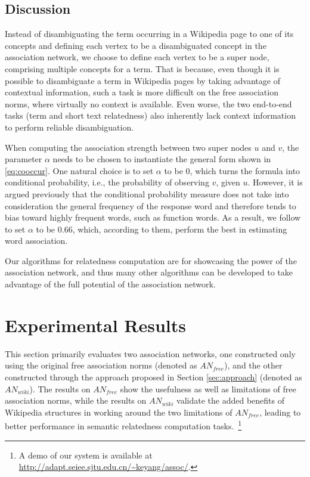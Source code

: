 \documentclass[letterpaper]{article}
\newcommand{\secref}[1]{Section \ref{#1}}
\begin{document}
\subsection{Discussion}
\label{sec:discussion}

Instead of disambiguating the term occurring in a Wikipedia page to
one of its concepts and defining each vertex to be a disambiguated
concept in the association network, we choose to define each vertex
to be a super node, comprising multiple concepts for a term.
That is because, even though it is possible to disambiguate a term
in Wikipedia pages by taking advantage of contextual information,
such a task is more difficult on the free association norms, where
virtually no context is available. Even worse, the two end-to-end
tasks (term and short text relatedness) also
inherently lack context information to perform reliable
disambiguation.

When computing the association strength between two super nodes $u$ and
$v$, the parameter $\alpha$ needs to be chosen to instantiate the
general form shown in \eqref{eq:cooccur}. One natural choice is to
set $\alpha$ to be 0, which turns the formula into conditional
probability, i.e., the probability of observing $v$, given $u$.
However, it is argued previously \cite{Wettler:1993,asso09} that 
the conditional probability measure does not take into consideration the
general frequency of the response word and therefore tends to bias
toward highly frequent words, such as function words. As a result, 
we follow \cite{Wettler:1993} to set $\alpha$ to be 0.66, 
which, according to them, perform the best in estimating word association. 

Our algorithms for relatedness computation are for showcasing the power of 
the association network, and thus many other algorithms
can be developed to  take advantage of the full potential of the association network.

\section{Experimental Results}
\label{sec:eval}

This section primarily evaluates two association networks, one
constructed only using the original free association norms (denoted
as $AN_{free}$), and the other constructed through the approach
proposed in \secref{sec:approach} (denoted as $AN_{wiki}$). The
results on $AN_{free}$ show the usefulness as well as limitations of free association
norms, while the results
on $AN_{wiki}$ validate the added benefits of Wikipedia structures 
in working around the two limitations of $AN_{free}$, leading to
better performance in semantic relatedness computation tasks.~\footnote{A demo of our system is available at
\url{http://adapt.seiee.sjtu.edu.cn/~keyang/assoc/}.}
\end{document}
